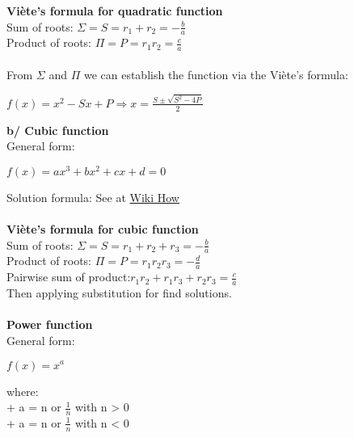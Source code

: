 \documentclass[12pt,a4paper]{article}
\newcommand{\superscript}[1]{^{{#1}}}
\newcommand{\subscript}[1]{_{{#1}}}
\begin{document}
\textbf{Viète's formula for quadratic function} \vspace{1mm}\\
Sum of roots: $\Sigma = S = r\subscript{1} + r\subscript{2} = -\frac{b}{a}$ \vspace{3mm}\\
Product of roots: $\Pi = P = r\subscript{1}r\subscript{2} = \frac{c}{a}$\\
\vspace{1mm}\\
From $\Sigma$ and $\Pi$ we can establish the function via the Viète's formula:
\begin{center}
$f(x) = x\superscript{2} - Sx + P \Rightarrow x = \frac{S\pm\sqrt{S^{2} - 4P}}{2}$
\end{center}
\noindent \textbf{b/ Cubic function}\\
General form:
\begin{center}
$f(x) = ax\superscript{3} + bx\superscript{2} + cx + d = 0$\\
\end{center}
Solution formula: See at \href{https://www.wikihow.com/Solve-a-Cubic-Equation}{Wiki How}\\\\
\textbf{Viète's formula for cubic function} \vspace{1mm}\\
Sum of roots: $\Sigma = S = r\subscript{1} + r\subscript{2} + r\subscript{3}= -\frac{b}{a}$ \vspace{3mm}\\
Product of roots: $\Pi = P = r\subscript{1}r\subscript{2}r\subscript{3} = -\frac{d}{a}$ \vspace{3mm}\\
Pairwise sum of product:$r\subscript{1}r\subscript{2} + r\subscript{1}r\subscript{3} + r\subscript{2}r\subscript{3} = \frac{c}{a}$
\vspace{3mm}\\
Then applying substitution for find solutions.\\ \\ \noindent
{\Large \textbf{Power function}}\\
General form:
\begin{center}
$f(x) = x\superscript{a}$
\end{center}
where:\\
+ a = n or $\frac{1}{n}$ with n > 0 \vspace{1mm}\\
+ a = n or $\frac{1}{n}$ with n < 0
\end{document}
